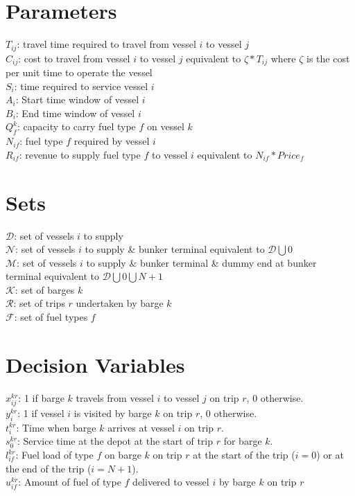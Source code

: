 \section{Parameters}
$T_{ij}$: travel time required to travel from vessel $i$ to vessel $j$\\
$C_{ij}$: cost to travel from vessel $i$ to vessel $j$ equivalent to $\zeta*T_{ij}$ where $\zeta$ is the cost per unit time to operate the vessel\\
$S_{i}$: time required to service vessel $i$\\
$A_{i}$: Start time window of vessel $i$\\
$B_{i}$: End time window of vessel $i$\\
$Q_{f}^{k}$: capacity to carry fuel type $f$ on vessel $k$\\
$N_{if}$: fuel type $f$ required by vessel $i$\\
$R_{if}$: revenue to supply fuel type $f$ to vessel $i$ equivalent to $N_{if} * Price_{f}$\\

\section{Sets}
$\mathcal{D}$: set of vessels $i$ to supply \\
$\mathcal{N}$: set of vessels $i$ to supply \& bunker terminal equivalent to $\mathcal{D} \bigcup {0}$\\
$\mathcal{M}$: set of vessels $i$ to supply \& bunker terminal \& dummy end at bunker terminal equivalent to  $\mathcal{D} \bigcup {0} \bigcup {N+1}$\\
$\mathcal{K}$: set of barges $k$\\
$\mathcal{R}$: set of trips $r$ undertaken by barge $k$\\
$\mathcal{F}$: set of fuel types $f$

\section{Decision Variables}
$x_{ij}^{kr}$: 1 if barge $k$ travels from vessel $i$ to vessel $j$ on trip $r$, 0 otherwise. \\
$y_{i}^{kr}$: 1 if vessel $i$ is visited by barge $k$ on trip $r$, 0 otherwise. \\
$t_{i}^{kr}$: Time when barge $k$ arrives at vessel $i$ on trip $r$. \\
$s_{0}^{kr}$: Service time at the depot at the start of trip $r$ for barge $k$.\\
$l_{if}^{kr}$: Fuel load of type $f$ on barge $k$ on trip $r$ at the start of the trip ($i = 0$) or at the end of the trip ($i = N+1$). \\
$u_{if}^{kr}$: Amount of fuel of type $f$ delivered to vessel $i$ by barge $k$ on trip $r$ 

